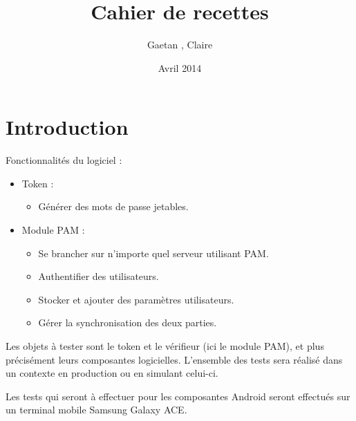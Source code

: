 \documentclass{"../../res/univ-projet"}
\title{Cahier de recettes}
\author{Gaetan \bsc{Ferry}, Claire \bsc{Hardouin}}
\date{Avril 2014}
\begin{document}
  \maketitle
  \section{Introduction}
  Fonctionnalités du logiciel :
  \begin{itemize}
    \item Token : 
    \begin{itemize}
      \item Générer des mots de passe jetables.
    \end{itemize}

    \item Module PAM :
    \begin{itemize}
      \item Se brancher sur n'importe quel serveur utilisant PAM.
      \item Authentifier des utilisateurs.
      \item Stocker et ajouter des paramètres utilisateurs.
      \item Gérer la synchronisation des deux parties.
    \end{itemize}
  \end{itemize}

  Les objets à tester sont le token et le vérifieur (ici le module PAM), et plus précisément leurs
  composantes logicielles. L'ensemble des tests sera réalisé dans un contexte \og{}en 
  production\fg{} ou en simulant celui-ci.
  
  Les tests qui seront à effectuer pour les composantes Android seront effectués sur un terminal
  mobile Samsung Galaxy ACE.
  
\end{document}
